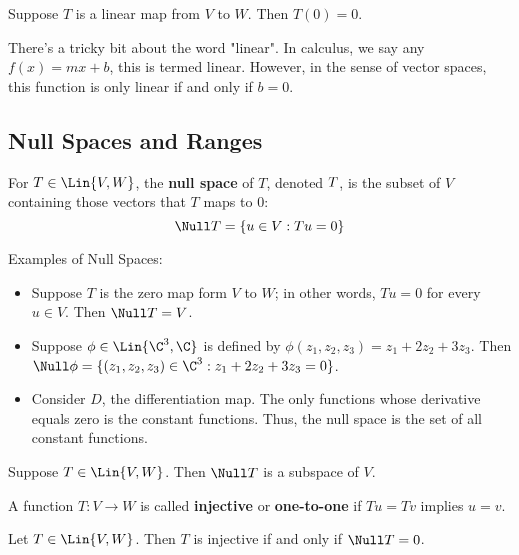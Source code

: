 \begin{theorem} 
   Suppose $T$ is a linear map from $V$ to $W$. Then $T(0) = 0$. 
\end{theorem}

There's a tricky bit about the word "linear". In calculus, we say any
$f(x) = mx + b$, this is termed linear. However, in the sense of vector spaces,
this function is only linear if and only if $b = 0$.

\subsection{Null Spaces and Ranges}

\begin{definition} 
   For $T \in \Lin{V, W}$, the \textbf{null space} of $T$, denoted $\null T$, is the subset of $V$
   containing those vectors that $T$ maps to 0:
   \[ \Null T = \{ u \in V : Tu = 0 \} \]
\end{definition}

\begin{example} Examples of Null Spaces:
   \begin{itemize}
      \item Suppose $T$ is the zero map form $V$ to $W$; in other words, $Tu = 0$ for
      every $u \in V$. Then $\Null T = V$.
      \item Suppose $\phi \in \Lin{\C^3, \C}$ is defined by $\phi(z_1, z_2, z_3) = z_1 + 2z_2 + 3z_3$.
      Then $\Null \phi = \{ (z_1, z_2, z_3) \in \C^3 : z_1 + 2z_2 + 3z_3 = 0 \}$.
      \item Consider $D$, the differentiation map. The only functions whose derivative equals zero
      is the constant functions. Thus, the null space is the set of all constant functions.
   \end{itemize}
\end{example}

\begin{theorem} 
   Suppose $T \in \Lin{V, W}$. Then $\Null T$ is a subspace of $V$.
\end{theorem}

\begin{definition} [Injective]
   A function $T : V \to W$ is called \textbf{injective} or \textbf{one-to-one} if
   $Tu = Tv$ implies $u = v$.
\end{definition}

\begin{theorem}
   Let $T \in \Lin{V, W}$. Then $T$ is injective if and only if $\Null T = 0$.
\end{theorem}

